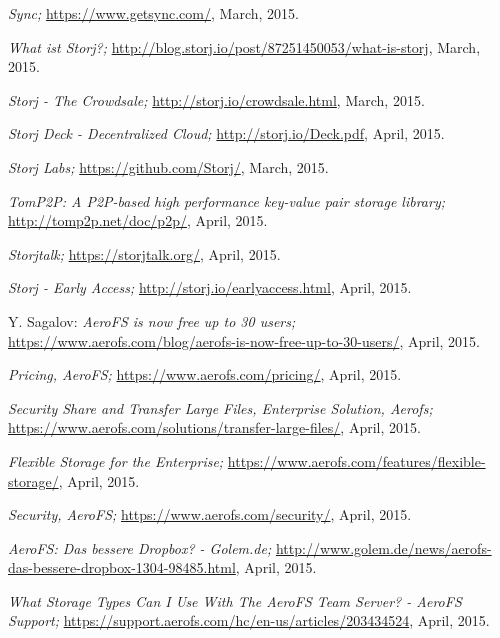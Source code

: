 \begin{thebibliography}{99}
		\emph{Sync;}
		\url{https://www.getsync.com/},
		March, 2015.
		
		\emph{What ist Storj?;}
		\url{http://blog.storj.io/post/87251450053/what-is-storj},
		March, 2015.
		
		\emph{Storj - The Crowdsale;}
		\url{http://storj.io/crowdsale.html},
		March, 2015.
		
		\emph{Storj Deck - Decentralized Cloud;}
		\url{http://storj.io/Deck.pdf},
		April, 2015.

		\emph{Storj Labs;}
		\url{https://github.com/Storj/},
		March, 2015.
		
		\emph{TomP2P: A P2P-based high performance key-value pair storage library;}
		\url{http://tomp2p.net/doc/p2p/},
		April, 2015.
		
		\emph{Storjtalk;}
		\url{https://storjtalk.org/},
		April, 2015.
		
		\emph{Storj - Early Access;}
		\url{http://storj.io/earlyaccess.html},
		April, 2015.
		
		Y. Sagalov:
		\emph{AeroFS is now free up to 30 users;}
		\url{https://www.aerofs.com/blog/aerofs-is-now-free-up-to-30-users/},
		April, 2015.
		
		\emph{Pricing, AeroFS;}
		\url{https://www.aerofs.com/pricing/},
		April, 2015.
		
		\emph{Security Share and Transfer Large Files, Enterprise Solution, Aerofs;}
		\url{https://www.aerofs.com/solutions/transfer-large-files/},
		April, 2015.
		
		\emph{Flexible Storage for the Enterprise;}
		\url{https://www.aerofs.com/features/flexible-storage/},
		April, 2015.
		
		\emph{Security, AeroFS;}
		\url{https://www.aerofs.com/security/},
		April, 2015.
		
		\emph{AeroFS: Das bessere Dropbox? - Golem.de;}
		\url{http://www.golem.de/news/aerofs-das-bessere-dropbox-1304-98485.html},
		April, 2015.
		
		\emph{What Storage Types Can I Use With The AeroFS Team Server? - AeroFS Support;}
		\url{https://support.aerofs.com/hc/en-us/articles/203434524},
		April, 2015.
		

\end{thebibliography}

